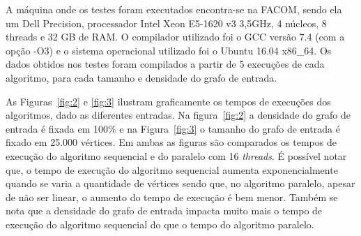 \documentclass[12pt]{article}
\begin{document}
A máquina onde os testes foram executados encontra-se na FACOM, sendo ela um Dell Precision, processador Intel Xeon E5-1620 v3 3,5GHz, 4 núcleos, 8 threads e 32 GB de RAM. O compilador utilizado foi o GCC versão 7.4 (com a opção -O3) e o sistema operacional utilizado foi o Ubuntu 16.04 x86\_64. Os dados obtidos nos testes foram compilados a partir de 5 execuções de cada algoritmo, para cada tamanho e densidade do grafo de entrada.

As Figuras~\ref{fig:2} e \ref{fig:3} ilustram graficamente os tempos de execuções dos algoritmos, dado as diferentes entradas. Na figura~\ref{fig:2} a densidade do grafo de entrada é fixada em 100\% e na Figura~\ref{fig:3} o tamanho do grafo de entrada é fixado em 25.000 vértices. Em ambas as figuras são comparados os tempos de execução do algoritmo sequencial e do paralelo com 16 \emph{threads}. É possível notar que, o tempo de execução do algoritmo sequencial aumenta exponencialmente quando se varia a quantidade de vértices sendo que, no algoritmo paralelo, apesar de não ser linear, o aumento do tempo de execução é bem menor. Também se nota que a densidade do grafo de entrada impacta muito mais o tempo de execução do algoritmo sequencial do que o tempo do algoritmo paralelo.
\end{document}

